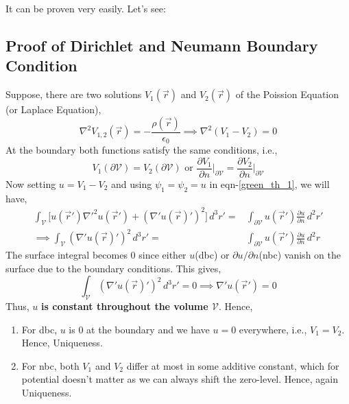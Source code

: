 \documentclass{article}
\begin{document}
It can be proven very easily. Let's see:
\subsection{Proof of Dirichlet and Neumann Boundary Condition}
Suppose, there are two solutions $V_1(\vec{r})$ and $V_2(\vec{r})$ of the Poission Equation (or Laplace Equation),
\begin{equation}
    \nabla^2 V_{1,2}(\vec{r}) = -\frac{\rho(\vec{r})}{\epsilon_0} \implies \nabla^2 (V_1 -V_2) = 0
\end{equation}
At the boundary both functions satisfy the same conditions, i.e.,
\begin{equation}
    V_1(\partial \mathcal{V}) = V_2(\partial \mathcal{V}) \text{ \ \ or \ \ } \frac{\partial V_1}{\partial n}\Bigg|_{\partial \mathcal{V}} = \frac{\partial V_2}{\partial n}\Bigg|_{\partial \mathcal{V}}
\end{equation}
Now setting $u=V_1 - V_2$ and using $\psi_1=\psi_2=u$ in eqn-\ref{green_th_1},  we will have,
\begin{equation}
\begin{split}
    \int_{\mathcal{V}} \Bigg [ u(\vec{r}')\nabla'^2u(\vec{r}') + (\nabla'u(\vec{r})')^2 \Bigg]\, d^3r' =& \int_{\partial \mathcal{V}} u(\vec{r}')\frac{\partial u}{\partial n}\, d^2r'\\
    \implies \int_{\mathcal{V}}  (\nabla'u(\vec{r})')^2 \, d^3r' =& \int_{\partial \mathcal{V}} u(\vec{r}')\frac{\partial u}{\partial n}\, d^2r
\end{split}
\end{equation}
The surface integral becomes $0$ since either $u$(\gls{dbc}) or $\partial u/\partial n$(\gls{nbc}) vanish on the surface due to the boundary conditions. This gives,
\begin{equation}
     \int_{\mathcal{V}}  (\nabla'u(\vec{r})')^2 \, d^3r' = 0 \implies \nabla'u(\vec{r}')=0
\end{equation}
Thus, $u$ \textbf{is constant throughout the volume $\mathcal{V}$}. Hence,
\begin{enumerate}
    \item For \gls{dbc}, $u$ is $0$ at the boundary and we have $u=0$ everywhere, i.e., $V_1=V_2$. Hence, Uniqueness.
    \item For \gls{nbc}, both $V_1$ and $V_2$ differ at most in some additive constant, which for potential doesn't matter as we can always shift the zero-level. Hence, again Uniqueness.
\end{enumerate}
\end{document}
